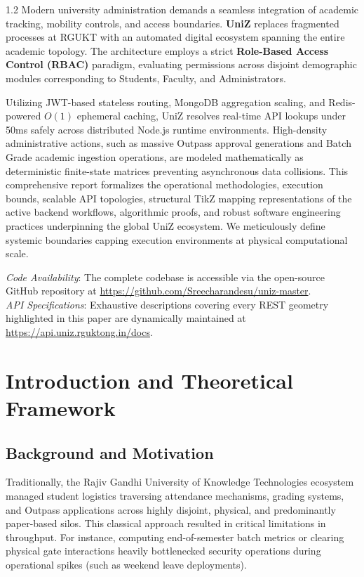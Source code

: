 \documentclass[journal,onecolumn,10pt,draftclsnofoot]{IEEEtran}
\begin{document}
\begin{spacing}{1.2}
Modern university administration demands a seamless integration of academic tracking, mobility controls, and access boundaries. \textbf{UniZ} replaces fragmented processes at RGUKT with an automated digital ecosystem spanning the entire academic topology. The architecture employs a strict \textbf{Role-Based Access Control (RBAC)} paradigm, evaluating permissions across disjoint demographic modules corresponding to Students, Faculty, and Administrators.

Utilizing JWT-based stateless routing, MongoDB aggregation scaling, and Redis-powered $O(1)$ ephemeral caching, UniZ resolves real-time API lookups under 50ms safely across distributed Node.js runtime environments. High-density administrative actions, such as massive Outpass approval generations and Batch Grade academic ingestion operations, are modeled mathematically as deterministic finite-state matrices preventing asynchronous data collisions. This comprehensive report formalizes the operational methodologies, execution bounds, scalable API topologies, structural TikZ mapping representations of the active backend workflows, algorithmic proofs, and robust software engineering practices underpinning the global UniZ ecosystem. We meticulously define systemic boundaries capping execution environments at physical computational scale.

\vspace{0.3cm}
\noindent\textit{Code Availability}: The complete codebase is accessible via the open-source GitHub repository at \url{https://github.com/Sreecharandesu/uniz-master}. \\
\noindent\textit{API Specifications}: Exhaustive descriptions covering every REST geometry highlighted in this paper are dynamically maintained at \url{https://api.uniz.rguktong.in/docs}.
\end{spacing}

\newpage
\tableofcontents
\newpage
{}

\section{Introduction and Theoretical Framework}

\subsection{Background and Motivation}
Traditionally, the Rajiv Gandhi University of Knowledge Technologies ecosystem managed student logistics traversing attendance mechanisms, grading systems, and Outpass applications across highly disjoint, physical, and predominantly paper-based silos. This classical approach resulted in critical limitations in throughput. For instance, computing end-of-semester batch metrics or clearing physical gate interactions heavily bottlenecked security operations during operational spikes (such as weekend leave deployments).
\end{document}
